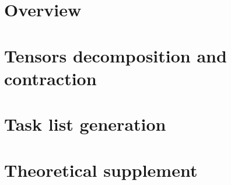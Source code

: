 \documentclass[12pt]{report}
\begin{document}
\tableofcontents

\chapter*{Overview}


\chapter{Tensors decomposition and contraction}


\chapter{Task list generation}


\chapter{Theoretical supplement}


{}

\end{document}
